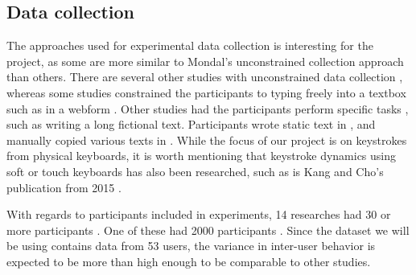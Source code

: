 \subsection{Data collection}
\label{sec:related-overview-collection}
The approaches used for experimental data collection is interesting for the project, as some are more similar to Mondal's \cite{mondal} unconstrained collection approach than others.
There are several other studies with unconstrained data collection \cite{Ahmed, BOURS201236, superResults, sliding, Janakiraman2007,  Pinto2014, chi-square, dowl, occ}, whereas some studies constrained the participants to typing freely into a textbox such as in a webform \cite{davoudi2009, davoudi2010, gnp, Solami, KANG201572, markov, meaningless}.
Other studies had the participants perform specific tasks \cite{monaco, Monrose,  park, 900words}, such as writing a long fictional text.
Participants wrote static text in \cite{hu, Kolakowska2011}, and manually copied various texts in \cite{meaningless, alsultan, KIM2017}.
While the focus of our project is on keystrokes from physical keyboards, it is worth mentioning that keystroke dynamics using soft or touch keyboards has also been researched, such as is Kang and Cho's publication from 2015 \cite{KANG201572}.

With regards to participants included in experiments, 14 researches had 30 or more participants \cite{Messerman, gnp, Ahmed, superResults, KIM2017, 900words, sliding, Monrose, park, monaco, KANG201572, dowl, cognition, meaningless, stewart}.
One of these had 2000 participants \cite{900words}.
Since the dataset we will be using \cite{mondal} contains data from 53 users, the variance in inter-user behavior is expected to be more than high enough to be comparable to other studies.

